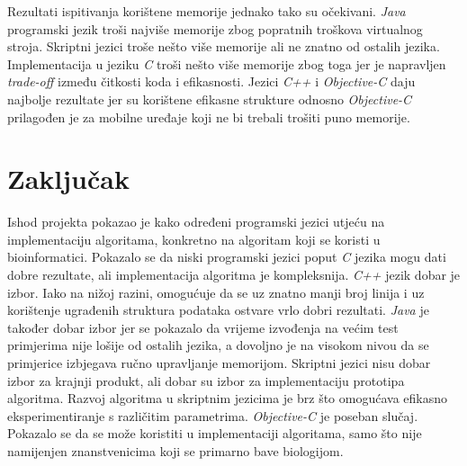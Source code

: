 \documentclass[times, utf8, seminar, numeric]{fer}
\begin{document}
Rezultati ispitivanja korištene memorije jednako tako su očekivani. \emph{Java} programski jezik troši najviše memorije zbog popratnih troškova virtualnog stroja. Skriptni jezici troše nešto više memorije ali ne znatno od ostalih jezika. Implementacija u jeziku \emph{C} troši nešto više memorije zbog toga jer je napravljen \emph{trade-off} između čitkosti koda i efikasnosti. Jezici \emph{C++} i \emph{Objective-C} daju najbolje rezultate jer su korištene efikasne strukture odnosno \emph{Objective-C} prilagođen je za mobilne uređaje koji ne bi trebali trošiti puno memorije.

\chapter{Zaključak}

Ishod projekta pokazao je kako određeni programski jezici utjeću na implementaciju algoritama, konkretno na algoritam koji se koristi u bioinformatici. Pokazalo se da niski programski jezici poput \emph{C} jezika mogu dati dobre rezultate, ali implementacija algoritma je kompleksnija. \emph{C++} jezik dobar je izbor. Iako na nižoj razini, omogućuje da se uz znatno manji broj linija i uz korištenje ugrađenih struktura podataka ostvare vrlo dobri rezultati. \emph{Java} je također dobar izbor jer se pokazalo da vrijeme izvođenja na većim test primjerima nije lošije od ostalih jezika, a dovoljno je na visokom nivou da se primjerice izbjegava ručno upravljanje memorijom. Skriptni jezici nisu dobar izbor za krajnji produkt, ali dobar su izbor za implementaciju prototipa algoritma. Razvoj algoritma u skriptnim jezicima je brz što omogućava efikasno eksperimentiranje s različitim parametrima. \emph{Objective-C} je poseban slučaj. Pokazalo se da se može koristiti u implementaciji algoritama, samo što nije namijenjen znanstvenicima koji se primarno bave biologijom.

\end{document}

